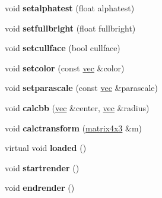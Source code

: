 \begin{DoxyCompactItemize}
void {\bfseries setalphatest} (float alphatest)
\item 
\mbox{\label{structanimmodel_acaca8dba6909d0ed2cf02095baac0fa4}} 
void {\bfseries setfullbright} (float fullbright)
\item 
\mbox{\label{structanimmodel_a4e172eba82417aefa5765edb2503c2be}} 
void {\bfseries setcullface} (bool cullface)
\item 
\mbox{\label{structanimmodel_ada194ea26cf44d12c873db81da8e7c57}} 
void {\bfseries setcolor} (const \hyperlink{structvec}{vec} \&color)
\item 
\mbox{\label{structanimmodel_a7b0919a98d2e2c78f8c8afd67fdd3fc2}} 
void {\bfseries setparascale} (const \hyperlink{structvec}{vec} \&parascale)
\item 
\mbox{\label{structanimmodel_a1f5ff7713f5429521fa935962947e7fb}} 
void {\bfseries calcbb} (\hyperlink{structvec}{vec} \&center, \hyperlink{structvec}{vec} \&radius)
\item 
\mbox{\label{structanimmodel_a135985486337c45bdb24c4e71ef704a4}} 
void {\bfseries calctransform} (\hyperlink{structmatrix4x3}{matrix4x3} \&m)
\item 
\mbox{\label{structanimmodel_a2286209e8ac8023894deabc008e851c6}} 
virtual void {\bfseries loaded} ()
\item 
\mbox{\label{structanimmodel_aa31164f6d65fa63b2a648218b027692e}} 
void {\bfseries startrender} ()
\item 
\mbox{\label{structanimmodel_abb05af72648b8abd5fd7d8683751bb82}} 
void {\bfseries endrender} ()
\end{DoxyCompactItemize}
